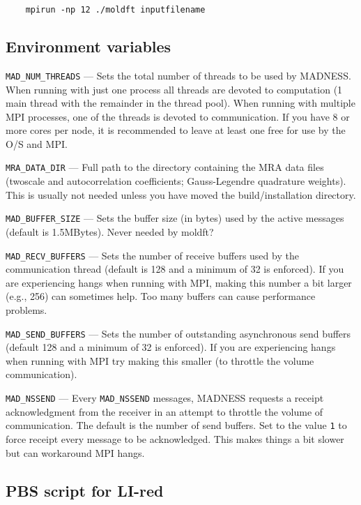 \documentclass[letterpaper]{book}
\begin{document}
\begin{verbatim}
    mpirun -np 12 ./moldft inputfilename
\end{verbatim}

\subsection{Environment variables}

\verb+MAD_NUM_THREADS+ --- Sets the total number of threads to be used
by MADNESS.  When running with just one process all threads are
devoted to computation (1 main thread with the remainder in the thread
pool).  When running with multiple MPI processes, one of the threads
is devoted to communication.  If you have 8 or more cores per node, it
is recommended to leave at least one free for use by the O/S and MPI.

\verb+MRA_DATA_DIR+ --- Full path to the directory containing the MRA
data files (twoscale and autocorrelation coefficients; Gauss-Legendre
quadrature weights).  This is usually not needed unless you have moved
the build/installation directory.

\verb+MAD_BUFFER_SIZE+ --- Sets the buffer size (in bytes) used by the
active messages (default is 1.5MBytes).  Never needed by moldft?

\verb+MAD_RECV_BUFFERS+ --- Sets the number of receive buffers used by
the communication thread (default is 128 and a minimum of 32 is
enforced).  If you are experiencing hangs when running with MPI,
making this number a bit larger (e.g., 256) can sometimes help. Too
many buffers can cause performance problems.

\verb+MAD_SEND_BUFFERS+ --- Sets the number of outstanding
asynchronous send buffers (default 128 and a minimum of 32 is
enforced).  If you are experiencing hangs when running with MPI try
making this smaller (to throttle the volume communication).

\verb+MAD_NSSEND+ --- Every \verb+MAD_NSSEND+ messages, MADNESS
requests a receipt acknowledgment from the receiver in an attempt to
throttle the volume of communication.  The default is the number of
send buffers.  Set to the value \verb+1+ to force receipt every
message to be acknowledged.  This makes things a bit slower but can
workaround MPI hangs.

\subsection{PBS script for LI-red}
\end{document}
